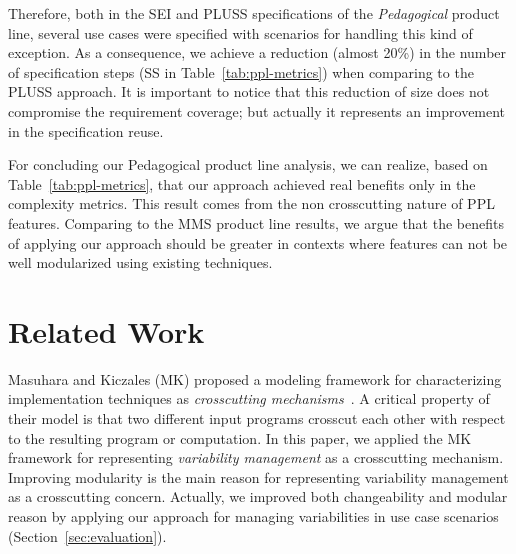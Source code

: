 \documentclass{report}
\begin{document}
\begin{frontmatter}
{Therefore, both in the SEI and PLUSS specifications of the \emph{Pedagogical} product line, several use cases were specified with scenarios for handling this kind of exception.
As a consequence, we achieve a reduction (almost 20\%) in the number of specification steps (SS in Table~\ref{tab:ppl-metrics}) when comparing to the PLUSS approach. It is important to notice that this reduction of size does not compromise the requirement coverage; but actually it represents an improvement in the specification reuse.

For concluding our Pedagogical product line analysis, we can realize, based on Table~\ref{tab:ppl-metrics}, that our approach achieved real benefits only in the complexity metrics. This result comes from the non crosscutting nature of PPL features. Comparing to the MMS product line results, we argue that the benefits of applying our approach should be greater in contexts where features can not be well modularized using existing techniques. 
   
\section{Related Work}
\label{sec:related}


Masuhara and Kiczales (MK) proposed a modeling framework 
for characterizing implementation techniques as 
\emph{crosscutting mechanisms}~\cite{kiczales-ecoop-2003}. 
A critical property of their model is that two different input 
programs crosscut each other with respect to the resulting 
program or computation. 
In this paper, we applied the MK framework for representing
\emph{variability management} as a crosscutting mechanism. Improving 
modularity is the main reason for representing variability management 
as a crosscutting concern. Actually, we improved both changeability and 
modular reason by applying our approach for managing variabilities 
in use case scenarios (Section~\ref{sec:evaluation}). 


}
\end{frontmatter}
\end{document}
